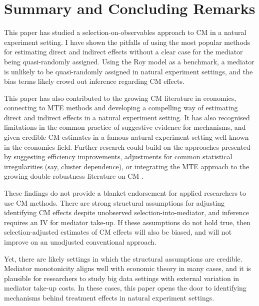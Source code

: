 \section{Summary and Concluding Remarks}
\label{sec:conclusion}
This paper has studied a selection-on-observables approach to CM in a natural experiment setting.
I have shown the pitfalls of using the most popular methods for estimating direct and indirect effects without a clear case for the mediator being quasi-randomly assigned.
Using the Roy model as a benchmark, a mediator is unlikely to be quasi-randomly assigned in natural experiment settings, and the bias terms likely crowd out inference regarding CM effects.

This paper has also contributed to the growing CM literature in economics, connecting to MTE methods and developing a compelling way of estimating direct and indirect effects in a natural experiment setting.
It has also recognised limitations in the common practice of suggestive evidence for mechanisms, and given credible CM estimates in a famous natural experiment setting well-known in the economics field.
Further research could build on the approaches presented by suggesting efficiency improvements, adjustments for common statistical irregularities (say, cluster dependence), or integrating the MTE approach to the growing double robustness literature on CM \citep{farbmacher2022causal,bia2024double}.

These findings do not provide a blanket endorsement for applied researchers to use CM methods.
There are strong structural assumptions for adjusting identifying CM effects despite unobserved selection-into-mediator, and inference requires an IV for mediator take-up.
If these assumptions do not hold true, then selection-adjusted estimates of CM effects will also be biased, and will not improve on an unadjusted conventional approach.

Yet, there are likely settings in which the structural assumptions are credible.
Mediator monotonicity aligns well with economic theory in many cases, and it is plausible for researchers to study big data settings with external variation in mediator take-up costs.
In these cases, this paper opens the door to identifying mechanisms behind treatment effects in natural experiment settings.
